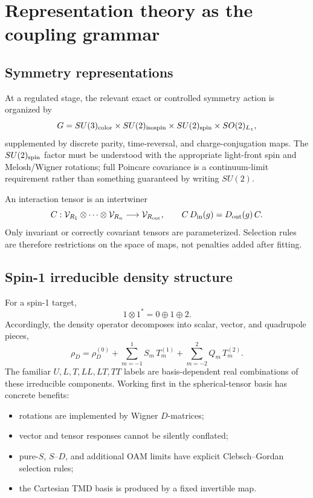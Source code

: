 \documentclass[11pt]{article}
\newcommand{\Rep}{\mathcal V}
\begin{document}
\section{Representation theory as the coupling grammar}

\subsection{Symmetry representations}

At a regulated stage, the relevant exact or controlled symmetry action is
organized by
\begin{equation}
G=
SU(3)_{\rm color}
\times SU(2)_{\rm isospin}
\times SU(2)_{\rm spin}
\times SO(2)_{L_z},
\label{eq:group-product}
\end{equation}
supplemented by discrete parity, time-reversal, and charge-conjugation maps.
The \(SU(2)_{\rm spin}\) factor must be understood with the appropriate
light-front spin and Melosh/Wigner rotations; full Poincare covariance is a
continuum-limit requirement rather than something guaranteed by writing
\(SU(2)\).

An interaction tensor is an intertwiner
\begin{equation}
C:\Rep_{R_1}\otimes\cdots\otimes\Rep_{R_n}\longrightarrow\Rep_{R_{\rm out}},
\qquad
C\,D_{\rm in}(g)=D_{\rm out}(g)\,C.
\label{eq:intertwiner}
\end{equation}
Only invariant or correctly covariant tensors are parameterized.  Selection
rules are therefore restrictions on the space of maps, not penalties added
after fitting.

\subsection{Spin-1 irreducible density structure}

For a spin-1 target,
\begin{equation}
1\otimes1^*=0\oplus1\oplus2.
\label{eq:spin1-decomp}
\end{equation}
Accordingly, the density operator decomposes into scalar, vector, and
quadrupole pieces,
\begin{equation}
\rho_D
=\rho_D^{(0)}
+\sum_{m=-1}^{1}S_m\,T_m^{(1)}
+\sum_{m=-2}^{2}Q_m\,T_m^{(2)}.
\label{eq:density-irrep}
\end{equation}
The familiar \(U,L,T,LL,LT,TT\) labels are basis-dependent real
combinations of these irreducible components.  Working first in the
spherical-tensor basis has concrete benefits:
\begin{itemize}
\item rotations are implemented by Wigner \(D\)-matrices;
\item vector and tensor responses cannot be silently conflated;
\item pure-\(S\), \(S\)--\(D\), and additional OAM limits have explicit
Clebsch--Gordan selection rules;
\item the Cartesian TMD basis is produced by a fixed invertible map.
\end{itemize}
\end{document}
